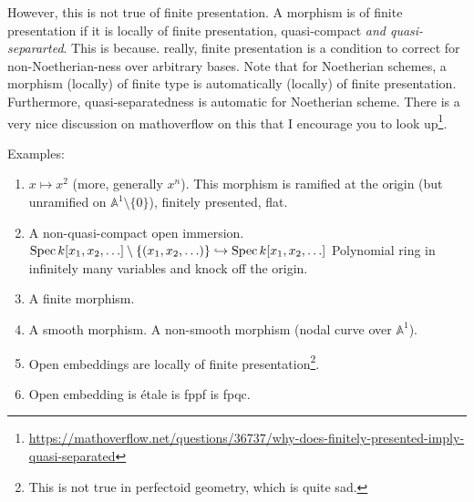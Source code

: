 \documentclass[11pt]{amsart}
\newcommand{\Spec}{{\rm Spec \,}}
\newcommand{\A}{{\mathbb A}}
\theoremstyle{definition}
\begin{document}
However, this is not true of finite presentation. A morphism is of finite presentation if it is locally of finite presentation, quasi-compact \textit{and quasi-separarted}. This is because. really, finite presentation is a condition to correct for non-Noetherian-ness over arbitrary bases. Note that for Noetherian schemes, a morphism (locally) of finite type is automatically (locally) of finite presentation. Furthermore, quasi-separatedness is automatic for Noetherian scheme. There is a very nice discussion on mathoverflow on this that I encourage you to look up\footnote{\href{https://mathoverflow.net/questions/36737/why-does-finitely-presented-imply-quasi-separated}{https://mathoverflow.net/questions/36737/why-does-finitely-presented-imply-quasi-separated}}. 

Examples:
\begin{enumerate}
	\item $x\mapsto x^2$ (more, generally $x^n$). This morphism is ramified at the origin (but unramified on $\A^1\setminus \lbrace 0\rbrace$), finitely presented, flat.
	\item A non-quasi-compact open immersion. $\Spec k[x_1,x_2,\ldots]\setminus\lbrace (x_1,x_2,\ldots)\rbrace\hookrightarrow \Spec k[x_1,x_2,\ldots]$ Polynomial ring in infinitely many variables and knock off the origin.
	\item A finite morphism. 
	\item A smooth morphism. A non-smooth morphism (nodal curve over $\A^1$).
	\item Open embeddings are locally of finite presentation\footnote{This is not true in perfectoid geometry, which is quite sad.}.
	\item Open embedding is \'{e}tale is fppf is fpqc.
\end{enumerate}


%

\end{document}
